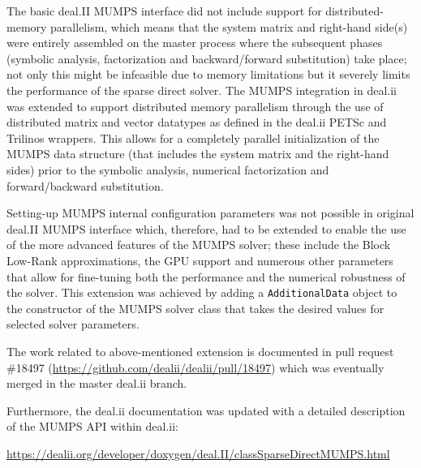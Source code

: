 \documentclass[a4paper,12pt]{article}
\begin{document}
The basic deal.II MUMPS interface did not include support for
distributed-memory parallelism, which means that the system matrix and
right-hand side(s) were entirely assembled on the master process where
the subsequent phases (symbolic analysis, factorization and
backward/forward substitution) take place; not only this might be
infeasible due to memory limitations but it severely limits the
performance of the sparse direct solver. The MUMPS integration in
deal.ii was extended to support distributed memory parallelism through
the use of distributed matrix and vector datatypes as defined in the
deal.ii PETSc and Trilinos wrappers. This allows for a completely
parallel initialization of the MUMPS data structure (that includes the
system matrix and the right-hand sides) prior to the symbolic
analysis, numerical factorization and forward/backward substitution.

Setting-up MUMPS internal configuration parameters was not possible in
original deal.II MUMPS interface which, therefore, had to be
extended to enable the use of the more advanced features of the MUMPS
solver; these include the Block Low-Rank approximations, the GPU
support and numerous other parameters that allow for fine-tuning both
the performance and the numerical robustness of the solver. This
extension was achieved by adding a \texttt{AdditionalData} object
to the constructor of the MUMPS solver class that takes the desired
values for selected solver parameters.

The work related to above-mentioned extension is documented in pull
request \#18497 (\url{https://github.com/dealii/dealii/pull/18497})
which was eventually merged in the master deal.ii branch.

Furthermore, the deal.ii documentation was updated with a detailed description
of the MUMPS API within deal.ii:

\url{https://dealii.org/developer/doxygen/deal.II/classSparseDirectMUMPS.html}
\end{document}
